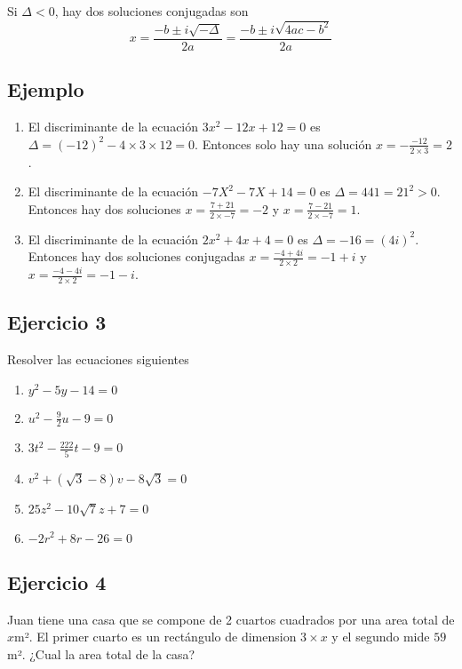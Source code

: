 Si $\Delta < 0$, hay dos soluciones conjugadas son
$$
x = \frac{-b \pm i \sqrt{-\Delta}}{2a} = \frac{-b \pm i \sqrt{4ac - b^2}}{2a}
$$

\subsection*{Ejemplo}

\begin{enumerate}
\item El discriminante de la ecuación $3x^2 -12x+12=0$ es
  $\Delta = {(-12)}^2 - 4 \times 3 \times 12 = 0$. Entonces solo hay una
  solución $x = -\frac{-12}{2 \times 3} = 2$.
\item El discriminante de la ecuación $-7X^2 -7 X +14 = 0$ es
  $\Delta = 441 = 21^2 > 0$. Entonces hay dos soluciones
  $x = \frac{7+21}{2 \times -7} = -2$ y
  $x = \frac{7-21}{2 \times -7} = 1$.
\item El discriminante de la ecuación $2x^2 + 4x + 4 = 0$ es
  $\Delta = -16 = {(4i)}^2$. Entonces hay dos soluciones conjugadas
  $x = \frac{-4+4i}{2 \times 2} = -1 + i$ y
  $x = \frac{-4-4i}{2 \times 2} = -1 - i$.
\end{enumerate}

\subsection*{Ejercicio 3}

Resolver las ecuaciones siguientes

\begin{enumerate}
\item $y^2 - 5y - 14 = 0$
\item $u^2 - \frac{9}{2}u - 9 = 0$
\item $3t^2 - \frac{222}{5}t - 9 = 0$
\item $v^2 + {(\sqrt3 - 8)}v - 8\sqrt3 = 0$
\item $25z^2  - 10\sqrt7 z  + 7 = 0$
\item $-2r^2 + 8r - 26 = 0$
\end{enumerate}

\subsection*{Ejercicio 4}

Juan tiene una casa que se compone de 2 cuartos cuadrados por una area total
de $x$m². El primer cuarto es un rectángulo de dimension $3 \times x$ y el
segundo mide $59$m². ¿Cual la area total de la casa?

